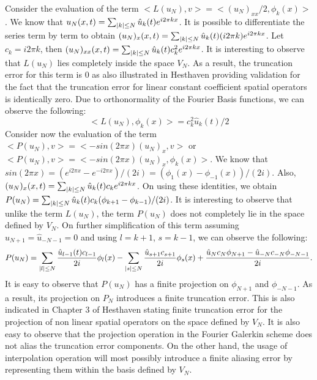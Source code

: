 \documentclass[12pt]{article}
\DeclarePairedDelimiter\abs{\lvert}{\rvert}
\begin{document}
Consider the evaluation of the term $<L(u_N), v> = <(u_N)_{xx}/2, \phi_k(x)>$. We know that $ u_N(x, t) = \sum_{\abs{k} \leq N} \hat{u}_k(t) e^{i2 \pi kx}$. It is possible to differentiate the series term by term to obtain $(u_N)_{x}(x, t) = \sum_{\abs{k} \leq N} \hat{u}_k(t) (i 2 \pi k) e^{i2 \pi kx}$. Let $c_k = i2 \pi k$, then $(u_N)_{xx}(x, t) = \sum_{\abs{k} \leq N} \hat{u}_k(t) c_k^2 e^{i2 \pi kx}$. It is interesting to observe that $L(u_N)$ lies completely inside the space $V_N$. As a result, the truncation error for this term is $0$ as also illustrated in Hesthaven providing validation for the fact that the truncation error for linear constant coefficient spatial operators is identically zero. Due to orthonormality of the Fourier Basis functions, we can observe the following:
\begin{equation}
    <L(u_N), \phi_k(x)> =c_k^2 \hat{u}_k(t)/2
    \label{LuN}
\end{equation}
Consider now the evaluation of the term $<P(u_N), v> = <-sin(2 \pi x)(u_N)_x, v>$ or $<P(u_N), v> = <-sin(2 \pi x)(u_N)_x, \phi_k(x)>$. We know that $sin(2 \pi x) = (e^{i 2 \pi x} - e^{-i 2 \pi x})/(2i) = (\phi_1(x) - \phi_{-1}(x))/(2i)$. Also, $(u_N)_{x}(x, t) = \sum_{\abs{k} \leq N}  \hat{u}_k(t) c_k e^{i2 \pi kx}$. On using these identities, we obtain $P(u_N) = \sum_{\abs{k} \leq N} \hat{u}_k(t) c_k (\phi_{k + 1} - \phi_{k - 1})/(2i)$. It is interesting to observe that unlike the term $L(u_N)$, the term $P(u_N)$ does not completely lie in the space defined by $V_N$. On further simplification of this term assuming $\hat{u}_{N + 1} = \hat{u}_{-N - 1} = 0$ and using $l = k + 1$, $s = k  - 1$, we can observe the following:
\begin{equation}
    P(u_N) = \sum_{\abs{l} \leq N} \frac{ \hat{u}_{l - 1}(t) c_{l - 1} }{2i} \phi_l(x) - \sum_{\abs{s} \leq N} \frac{\hat{u}_{s + 1} c_{s + 1}}{2i} \phi_s(x) + \frac{ \hat{u}_{N} c_{N} \phi_{N + 1} - \hat{u}_{-N} c_{-N} \phi_{-N - 1} }{2i}. 
    \label{PuN}
\end{equation}
It is easy to observe that $P(u_N)$ has a finite projection on $\phi_{N + 1}$ and $\phi_{-N - 1}$. As a result, its projection on $P_N$ introduces a finite truncation error. This is also indicated in Chapter $3$ of Hesthaven stating finite truncation error for the projection of non linear spatial operators on the space defined by $V_N$. It is also easy to observe that the projection operation in the Fourier Galerkin scheme does not alias the truncation error components. On the other hand, the usage of interpolation operation will most possibly introduce a finite aliasing error by representing them within the basis defined by $V_N$.
\end{document}
